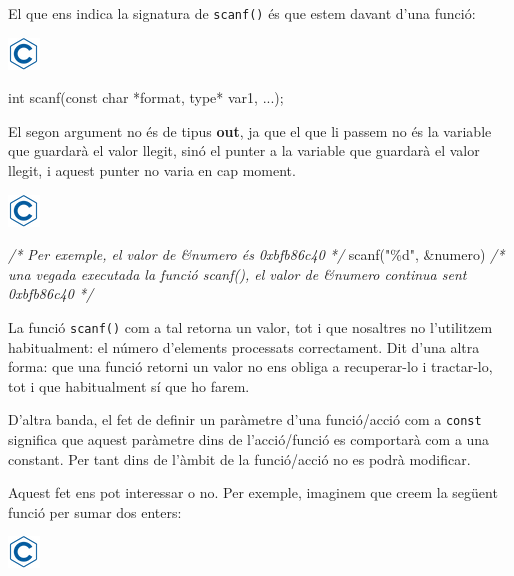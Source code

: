 \documentclass[
]{book}
\newenvironment{Shaded}{\begin{snugshade}}{\end{snugshade}}
\newcommand{\CommentTok}[1]{\textcolor[rgb]{0.56,0.35,0.01}{\textit{#1}}}
\newcommand{\DataTypeTok}[1]{\textcolor[rgb]{0.13,0.29,0.53}{#1}}
\newcommand{\NormalTok}[1]{#1}
\newcommand{\StringTok}[1]{\textcolor[rgb]{0.31,0.60,0.02}{#1}}
\begin{document}
El que ens indica la signatura de \texttt{scanf()} és que estem davant d'una funció:

\includegraphics{./img/c.png}

\begin{Shaded}
\begin{Highlighting}[]
\DataTypeTok{int}\NormalTok{ scanf(}\DataTypeTok{const} \DataTypeTok{char}\NormalTok{ *format, type* var1, ...);}
\end{Highlighting}
\end{Shaded}

El segon argument no és de tipus \textbf{out}, ja que el que li passem no és la variable que guardarà el valor llegit, sinó el punter a la variable que guardarà el valor llegit, i aquest punter no varia en cap moment.

\includegraphics{./img/c.png}

\begin{Shaded}
\begin{Highlighting}[]
\CommentTok{/* Per exemple, el valor de \&numero és 0xbfb86c40 */}
\NormalTok{scanf(}\StringTok{"\%d"}\NormalTok{, \&numero)}
\CommentTok{/* una vegada executada la funció scanf(), el valor de \&numero continua sent 0xbfb86c40 */}
\end{Highlighting}
\end{Shaded}

La funció \texttt{scanf()} com a tal retorna un valor, tot i que nosaltres no l'utilitzem habitualment: el número d'elements processats correctament. Dit d'una altra forma: que una funció retorni un valor no ens obliga a recuperar-lo i tractar-lo, tot i que habitualment sí que ho farem.

D'altra banda, el fet de definir un paràmetre d'una funció/acció com a \texttt{const} significa que aquest paràmetre dins de l'acció/funció es comportarà com a una constant. Per tant dins de l'àmbit de la funció/acció no es podrà modificar.

Aquest fet ens pot interessar o no. Per exemple, imaginem que creem la següent funció per sumar dos enters:

\includegraphics{./img/c.png}
\end{document}
